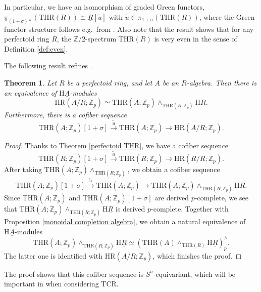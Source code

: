 \documentclass[10pt]{amsart}
\newtheorem{thm}{Theorem}[section]
\theoremstyle{definition}
\numberwithin{equation}{section}
\newcommand{\Z}{\mathbb{Z}}
\newcommand{\rH}{\mathrm{H}}
\newcommand{\ul}{\underline}
\newcommand{\HR}{\mathrm{HR}}
\newcommand{\THR}{\mathrm{THR}}
\newcommand{\TCR}{\mathrm{TCR}}
\begin{document}
In particular, we have an isomorphism of
graded Green functors,
$\underline{\pi}_{(1+\sigma)*}(\THR(R)) \cong \ul{R} [\tilde{u}]$
with $\tilde{u} \in \pi_{1 + \sigma}(\THR(R))$,
where the Green functor structure follows e.g.\ from \cite[section A.4]{HP23}.
Also note that the result shows that for any perfectoid ring $R$, the $\Z/2$-spectrum $\THR(R)$ is very even in the sense of Definition \ref{def:even}.



The following result refines \cite[Theorem 6.7]{BMS19}. 

\begin{thm}\label{cofibersequence}
Let $R$ be a perfectoid ring,
and let $A$ be an $R$-algebra.
Then there is an equivalence of $\rH \ul{A}$-modules
\[
\HR(A/R;\Z_p)
\simeq
\THR(A;\Z_p)
\wedge_{\THR(R;\Z_p)}
\rH \ul{R}.
\]
Furthermore,
there is a cofiber sequence
$$ \THR(A;\Z_p)[1+ \sigma] \xrightarrow{\tilde{u}}  \THR(A;\Z_p) \to \HR(A/R;\Z_p).$$
\end{thm}
\begin{proof}
Thanks to Theorem \ref{perfectoid THR},
we have a cofiber sequence
\[
\THR(R;\Z_p)[1+\sigma] \xrightarrow{\tilde{u}}  \THR(R;\Z_p) \to \HR(R/R;\Z_p).
\]
After taking $\THR(A;\Z_p)\wedge_{\THR(R;\Z_p)}$,
we obtain a cofiber sequence
\[
\THR(A;\Z_p)[1+\sigma] \xrightarrow{\tilde{u}}  \THR(A;\Z_p) \to \THR(A;\Z_p)\wedge_{\THR(R;\Z_p)}\rH \ul{R}.
\]
Since $\THR(A;\Z_p)$ and $\THR(A;\Z_p)[1+\sigma]$ are derived $p$-complete,
we see that
$\THR(A;\Z_p)\wedge_{\THR(R;\Z_p)}\rH \ul{R}$ is derived $p$-complete.
Together with Proposition \ref{monoidal completion algebra},
we obtain a natural equivalence of $\rH \ul{A}$-modules
\[
\THR(A;\Z_p)\wedge_{\THR(R;\Z_p)}\rH \ul{R}
\simeq
(\THR(A)\wedge_{\THR(R)}\rH \ul{R})_p^\wedge.
\]
The latter one is identified with $\HR(A/R;\Z_p)$,
which finishes the proof.
\end{proof}

The proof shows that this cofiber sequence is $S^{\sigma}$-equivariant, which will be important in \cite{Par23} when considering $\TCR$.


\medskip
\end{document}
